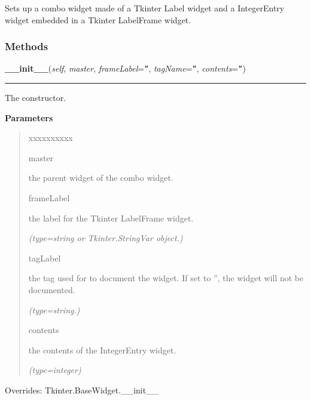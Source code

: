 Sets up a combo widget made of a Tkinter Label widget and a IntegerEntry 
widget embedded in a Tkinter LabelFrame widget.



  \subsubsection{Methods}

    \vspace{0.5ex}

\hspace{.8\funcindent}\begin{boxedminipage}{\funcwidth}

    \raggedright \textbf{\_\_init\_\_}(\textit{self}, \textit{master}, \textit{frameLabel}={\tt ''}, \textit{tagName}={\tt ''}, \textit{contents}={\tt ''})

    \vspace{-1.5ex}

    \rule{\textwidth}{0.5\fboxrule}
\setlength{\parskip}{2ex}
    The constructor.

\setlength{\parskip}{1ex}
      \textbf{Parameters}
      \vspace{-1ex}

      \begin{quote}
        \begin{Ventry}{xxxxxxxxxx}

          \item[master]

          the parent widget of the combo widget.

          \item[frameLabel]

          the label for the Tkinter LabelFrame widget.

            {\it (type=string or Tkinter.StringVar object.)}

          \item[tagLabel]

          the tag used for to document the widget. If set to '', the widget
          will not be documented.

            {\it (type=string.)}

          \item[contents]

          the contents of the IntegerEntry widget.

            {\it (type=integer)}

        \end{Ventry}

      \end{quote}

      Overrides: Tkinter.BaseWidget.\_\_init\_\_

    \end{boxedminipage}

